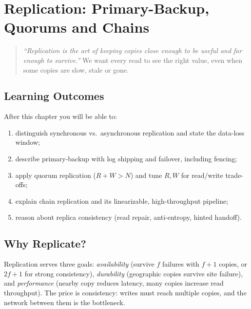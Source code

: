 \chapter{Replication: Primary-Backup, Quorums and Chains}
\label{ch:replication}

\begin{quote}
\emph{``Replication is the art of keeping copies close enough to be useful and far enough to survive.''} We want every read to see the right value, even when some copies are slow, stale or gone.
\end{quote}

\noindent{}
\vspace{0.4em}

\section*{Learning Outcomes}
After this chapter you will be able to:
\begin{enumerate}[label=(L\arabic*)]
    \item distinguish synchronous vs.\ asynchronous replication and state the data-loss window;
    \item describe primary-backup with log shipping and failover, including fencing;
    \item apply quorum replication ($R+W>N$) and tune $R,W$ for read/write trade-offs;
    \item explain chain replication and its linearizable, high-throughput pipeline;
    \item reason about replica consistency (read repair, anti-entropy, hinted handoff).
\end{enumerate}

\section{Why Replicate?}
\label{sec:why-replicate}
Replication serves three goals: \emph{availability} (survive $f$ failures with $f+1$ copies, or $2f+1$ for strong consistency), \emph{durability} (geographic copies survive site failure), and \emph{performance} (nearby copy reduces latency, many copies increase read throughput). The price is consistency: writes must reach multiple copies, and the network between them is the bottleneck.

